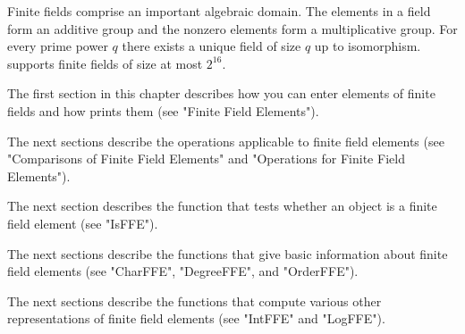 %

Finite fields comprise an important algebraic  domain.  The elements in a
field  form   an   additive  group   and  the  nonzero  elements  form  a
multiplicative  group.  For  every prime power $q$ there exists  a unique
field of  size  $q$ up to isomorphism.  {\GAP} supports finite fields  of
size at most $2^{16}$.

The first section in this chapter describes how you can enter elements of
finite fields and how {\GAP} prints them (see "Finite Field Elements").

The  next sections describe  the  operations applicable to  finite  field
elements (see "Comparisons of  Finite Field Elements" and "Operations for
Finite Field Elements").

The next section describes the function that tests whether an object is a
finite field element (see "IsFFE").

The  next sections describe   the functions  that give  basic information
about finite field elements (see "CharFFE", "DegreeFFE", and "OrderFFE").

The next  sections  describe  the functions  that compute  various  other
representations of finite field elements (see "IntFFE" and "LogFFE").


